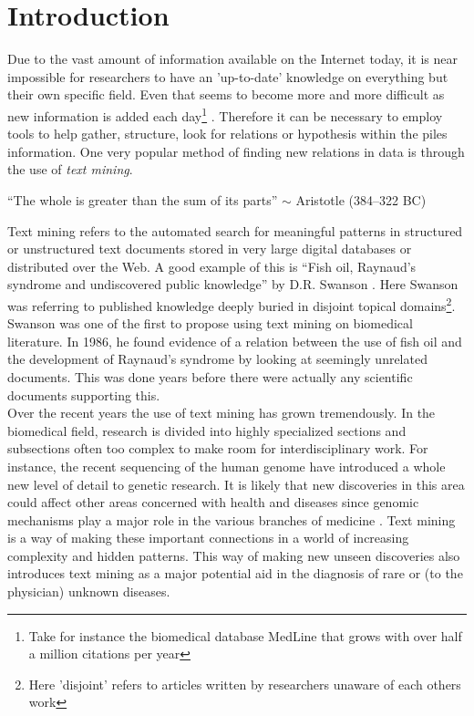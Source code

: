 \chapter{Introduction\label{Introduction}}

Due to the vast amount of information available on the Internet today,
it is near impossible for researchers to have an 'up-to-date'
knowledge on everything but their own specific field. Even that seems
to become more and more difficult as new information is added each day\footnote{Take for instance the biomedical
  database MedLine that grows with over half a million citations per
  year}
\cite{CitAddMedLine}. Therefore it can be necessary to employ tools to help gather,
structure, look for relations or hypothesis within the piles
information. One very popular method of finding new relations in data
is through the use of \textit{text mining}.

\begin{center}
{\small``The whole is greater than the sum of its parts'' $\sim$ Aristotle
(384--322 BC)} 
\end{center}

Text mining refers to the automated search for meaningful patterns in
structured or unstructured text documents stored in very large digital
databases or distributed over the Web. A good example of this is
``Fish oil, Raynaud's syndrome and undiscovered public knowledge'' by
D.R. Swanson \cite{DRSwanson}. Here Swanson was referring to published
knowledge deeply buried in disjoint topical domains\footnote{Here
  'disjoint' refers to articles written by researchers unaware of each
  others work}. Swanson was one of the first to propose using text
mining on biomedical literature. In 1986, he found evidence of a
relation between the use of fish oil and the development of Raynaud's
syndrome by looking at seemingly unrelated documents. This was done
years before there were actually any scientific documents supporting
this. \\

Over the recent years the use of text mining has grown
tremendously. In the biomedical field, research is divided into highly
specialized sections and subsections often too complex to make room
for interdisciplinary work. For instance, the recent sequencing of the
human genome have introduced a whole new level of detail to genetic
research. It is likely that new discoveries in this area could affect
other areas concerned with health and diseases since genomic
mechanisms play a major role in the various branches of medicine
\cite{survey.biomed.text.cohen.2005}. Text mining is a way of making
these important connections in a world of increasing complexity and
hidden patterns. This way of making new unseen discoveries also
introduces text mining as a major potential aid in the diagnosis of
rare or (to the physician) unknown diseases.\\


